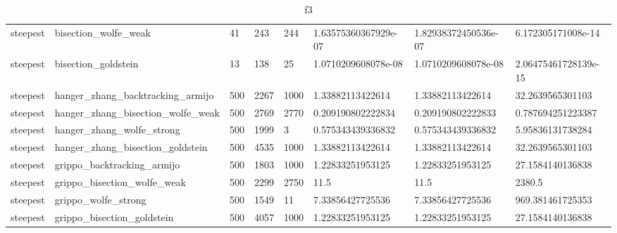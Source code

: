 \documentclass[a4paper,11pt]{article}
\numberwithin{equation}{section} %
\begin{document}
\begin{table}[h!]
{\begin{tabular}{|l|l|l|l|l|l|l|l|}
        steepest & bisection\_wolfe\_weak & 41 & 243 & 244 & 1.63575360367929e-07 & 1.82938372450536e-07 & 6.172305171008e-14 \\
        steepest & bisection\_goldstein & 13 & 138 & 25 & 1.0710209608078e-08 & 1.0710209608078e-08 & 2.06475461728139e-15 \\
        steepest & hanger\_zhang\_backtracking\_armijo & 500 & 2267 & 1000 & 1.33882113422614 & 1.33882113422614 & 32.2639565301103 \\
        steepest & hanger\_zhang\_bisection\_wolfe\_weak & 500 & 2769 & 2770 & 0.209190802222834 & 0.209190802222833 & 0.787694251223387 \\
        steepest & hanger\_zhang\_wolfe\_strong & 500 & 1999 & 3 & 0.575343439336832 & 0.575343439336832 & 5.95836131738284 \\
        steepest & hanger\_zhang\_bisection\_goldstein & 500 & 4535 & 1000 & 1.33882113422614 & 1.33882113422614 & 32.2639565301103 \\
        steepest & grippo\_backtracking\_armijo & 500 & 1803 & 1000 & 1.22833251953125 & 1.22833251953125 & 27.1584140136838 \\
        steepest & grippo\_bisection\_wolfe\_weak & 500 & 2299 & 2750 & 11.5 & 11.5 & 2380.5 \\
        steepest & grippo\_wolfe\_strong & 500 & 1549 & 11 & 7.33856427725536 & 7.33856427725536 & 969.381461725353 \\
        steepest & grippo\_bisection\_goldstein & 500 & 4057 & 1000 & 1.22833251953125 & 1.22833251953125 & 27.1584140136838 \\


\end{tabular}}
\caption{f3}
\label{table:f3}
\end{table}
\end{document}
